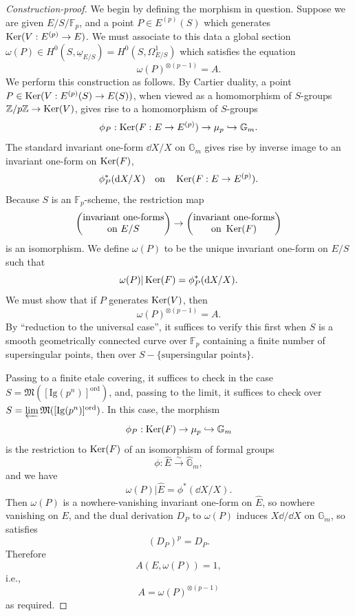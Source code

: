 \begin{proof}[Construction-proof]
We begin by defining the morphism in question. Suppose we are given $E/S/\mathbb{F}_p$, and a point $P \in E^{(p)}(S)$ which generates $\operatorname{Ker}(V : E^{(p)} \to E)$. We must associate to this data a global section $\omega(P) \in H^0(S, \underline{\omega}_{E/S}) = H^0(S, \Omega^1_{E/S})$ which satisfies the equation
\[
\omega(P)^{\otimes(p-1)} = A .
\]
We perform this construction as follows. By Cartier duality, a point $P \in \operatorname{Ker}(V : E^{(p)}(S) \to E(S))$, when viewed as a homomorphism of $S$-groups $\mathbb{Z}/p\mathbb{Z} \to \operatorname{Ker}(V)$, gives rise to a homomorphism of $S$-groups
\[
\phi_P : \operatorname{Ker}(F : E \to E^{(p)}) \to \mu_p \hookrightarrow \mathbb{G}_m .
\]
The standard invariant one-form $\dd X/X$ on $\mathbb{G}_m$ gives rise by inverse image to an invariant one-form on $\operatorname{Ker}(F)$,
\[
\phi_P^*(\mathrm{d} X/X) \quad\text{on}\quad \operatorname{Ker}(F : E \to E^{(p)}) .
\]
Because $S$ is an $\mathbb{F}_p$-scheme, the restriction map
\[
\begin{pmatrix}
\text{invariant one-forms} \\
\text{on } E/S
\end{pmatrix}
\to
\begin{pmatrix}
\text{invariant one-forms} \\
\text{on } \operatorname{Ker}(F)
\end{pmatrix}
\]
is an isomorphism. We define $\omega(P)$ to be the unique invariant one-form on $E/S$ such that
\[
\omega(P)|\operatorname{Ker}(F) = \phi_P^*(\mathrm{d} X/X) .
\]
We must show that if $P$ generates $\operatorname{Ker}(V)$, then
\[
\omega(P)^{\otimes(p-1)} = A .
\]
By ``reduction to the universal case'', it suffices to verify this first when $S$ is a smooth geometrically connected curve over $\mathbb{F}_p$ containing a finite number of supersingular points, then over $S - \{\text{supersingular points}\}$.

Passing to a finite etale covering, it suffices to check in the case $S = \mathfrak{M}([\mathrm{Ig}(p^n)]^{\mathrm{ord}})$, and, passing to the limit, it suffices to check over $S = \varprojlim \mathfrak{M}([\mathrm{Ig}(p^n)]^{\mathrm{ord}})$. In this case, the morphism
\[
\phi_P : \operatorname{Ker}(F) \to \mu_p \hookrightarrow \mathbb{G}_m
\]
is the restriction to $\operatorname{Ker}(F)$ of an isomorphism of formal groups
\[
\phi : \widehat{E} \xrightarrow{\ \sim\ } \widehat{\mathbb{G}}_m ,
\]
and we have
\[
\omega(P)|\widehat{E} = \phi^*(\dd X/X) .
\]
Then $\omega(P)$ is a nowhere-vanishing invariant one-form on $\widehat{E}$, so nowhere vanishing on $E$, and the dual derivation $D_P$ to $\omega(P)$ induces $X\dd/\dd X$ on $\mathbb{G}_m$, so satisfies
\[
(D_P)^p = D_P .
\]
Therefore
\[
A(E, \omega(P)) = 1 ,
\]
i.e.,
\[
A = \omega(P)^{\otimes(p-1)}
\]
as required.


\end{proof}

